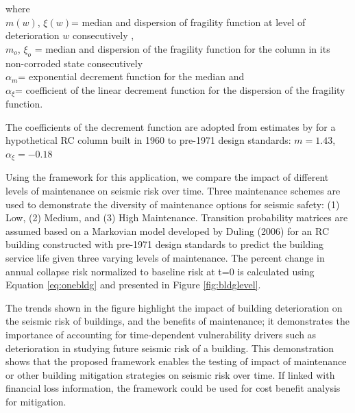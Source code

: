 where \\
$m(w)$, $\xi(w)$= median and dispersion of fragility function at level of deterioration $w$ consecutively ,\\
$m_{o}$, $\xi_{o}$ = median and dispersion of the fragility function for the column in its non-corroded state consecutively\\
$\alpha_{m}$=  exponential decrement function for the median and \\
$\alpha_{\xi}$=  coefficient of the linear decrement function for the dispersion of the fragility function.

The coefficients of the decrement function are adopted from estimates by \cite{rao2017development} for a hypothetical RC column built in 1960 to pre-1971 design standards: 
$m=1.43$,	$\alpha_{\xi}= -0.18 $

Using the framework for this application, we compare the impact of different levels of maintenance on seismic risk over time. Three maintenance schemes are used to demonstrate the diversity of maintenance options for seismic safety: (1) Low, (2) Medium, and (3) High Maintenance.
Transition probability matrices are assumed based on a Markovian model developed by Duling (2006) for an RC building constructed with pre-1971 design standards to predict the building service life given three varying levels of maintenance. The percent change in annual collapse risk normalized to baseline risk at t=0 is calculated using Equation \ref{eq:onebldg} and presented in Figure \ref{fig:bldglevel}. 

The trends shown in the figure highlight the impact of building deterioration on the seismic risk of buildings, and the benefits of maintenance; it demonstrates the importance of accounting for time-dependent vulnerability drivers such as deterioration in studying future seismic risk of a building. This demonstration shows that the proposed framework enables the testing of impact of maintenance or other building mitigation strategies on seismic risk over time. If linked with financial loss information, the framework could be used for cost benefit analysis for mitigation.

